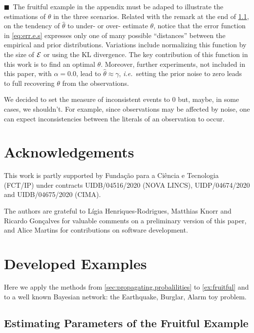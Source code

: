 \documentclass[a4paper]{article}
\newcommand{\cla}[1]{\ensuremath{{\cal #1}}}        %
\newcommand{\EVENTSset}{\ensuremath{\cla{E}}}
\newcommand{\LOOK}{\ensuremath{\blacksquare}}
\newcommand{\franc}[1]{{\color{green!30!black}#1}}
\begin{document}
\franc{\LOOK~The fruitful example in the appendix must be adaped to
  illustrate the estimations of \(\theta\) in the three scenarios.}
Related with the remark at the end of \cref{subsec:sbf.example}, on
the tendency of \(\hat{\theta}\) to under- or over- estimate
\(\theta\), notice that the error function in \eqref{eq:err.e.s}
expresses only one of many possible ``distances'' between the
empirical and prior distributions.  Variations include normalizing
this function by the size of \(\EVENTSset\) or using the \acl{KL}
divergence.  The key contribution of this function in this work is to
find an optimal \(\theta\).  Moreover, further experiments, not
included in this paper, with \(\alpha = 0.0\), lead to
\(\hat{\theta} \approx \gamma\), \emph{i.e.}\ setting the prior noise
to zero leads to full recovering \(\theta\) from the observations.

We decided to set the measure of inconsistent events to \(0\) but,
maybe, in some cases, we shouldn't.  For example, since observations
may be affected by noise, one can expect inconsistencies between the
literals of an observation to occur.
%
%
%
\section*{Acknowledgements}
%
%
%
This work is partly supported by Funda\c{c}\~ao para a Ci\^{e}ncia e
Tecnologia (FCT/IP) under contracts UIDB/04516/2020 (NOVA LINCS),
UIDP/04674/2020 and UIDB/04675/2020 (CIMA).

The authors are grateful to Lígia Henriques-Rodrigues, Matthias Knorr
and Ricardo Gonçalves for valuable comments on a preliminary version
of this paper, and Alice Martins for contributions on software
development.

\printbibliography


\newpage

\appendix

\section{Developed Examples}
\label{sec:developed.examples}

Here we apply the methods from \cref{sec:propagating.probalilities} to
\cref{ex:fruitful} and to a well known Bayesian network: the
Earthquake, Burglar, Alarm toy problem.


\subsection{Estimating Parameters of the Fruitful Example}\label{subsec:sbf.example}
\end{document}
